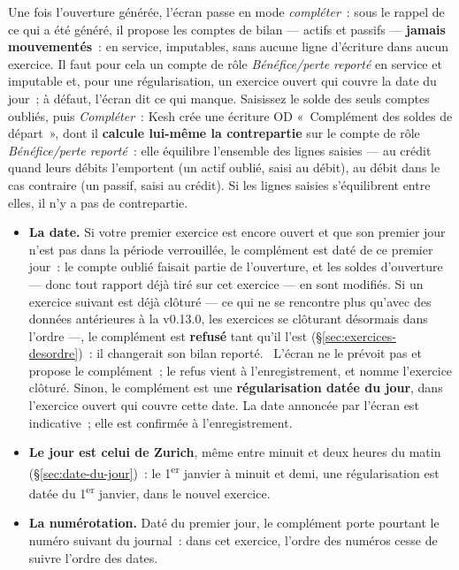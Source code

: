 \documentclass[a4paper,11pt,oneside]{article}
\begin{document}
Une fois l'ouverture générée, l'écran passe en mode \emph{compléter}~: sous le rappel de ce qui a été généré, il propose les comptes de bilan --- actifs et passifs --- \textbf{jamais mouvementés}~: en service, imputables, sans aucune ligne d'écriture dans aucun exercice. Il faut pour cela un compte de rôle \emph{Bénéfice/perte reporté} en service et imputable et, pour une régularisation, un exercice ouvert qui couvre la date du jour~; à défaut, l'écran dit ce qui manque. Saisissez le solde des seuls comptes oubliés, puis \emph{Compléter}~: Kesh crée une écriture OD «~Complément des soldes de départ~», dont il \textbf{calcule lui-même la contrepartie} sur le compte de rôle \emph{Bénéfice/perte reporté}~: elle équilibre l'ensemble des lignes saisies --- au crédit quand leurs débits l'emportent (un actif oublié, saisi au débit), au débit dans le cas contraire (un passif, saisi au crédit). Si les lignes saisies s'équilibrent entre elles, il n'y a pas de contrepartie.

\begin{itemize}
    \item \textbf{La date.} Si votre premier exercice est encore ouvert et que son premier jour n'est pas dans la période verrouillée, le complément est daté de ce premier jour~: le compte oublié faisait partie de l'ouverture, et les soldes d'ouverture --- donc tout rapport déjà tiré sur cet exercice --- en sont modifiés. Si un exercice suivant est déjà clôturé --- ce qui ne se rencontre plus qu'avec des données antérieures à la v0.13.0, les exercices se clôturant désormais dans l'ordre ---, le complément est \textbf{refusé} tant qu'il l'est (\S\ref{sec:exercices-desordre})~: il changerait son bilan reporté. \keshAttention\ L'écran ne le prévoit pas et propose le complément~; le refus vient à l'enregistrement, et nomme l'exercice clôturé. Sinon, le complément est une \textbf{régularisation datée du jour}, dans l'exercice ouvert qui couvre cette date. La date annoncée par l'écran est indicative~; elle est confirmée à l'enregistrement.
    \item \textbf{Le jour est celui de Zurich}, même entre minuit et deux heures du matin (\S\ref{sec:date-du-jour})~: le 1\textsuperscript{er} janvier à minuit et demi, une régularisation est datée du 1\textsuperscript{er} janvier, dans le nouvel exercice.
    \item \textbf{La numérotation.} Daté du premier jour, le complément porte pourtant le numéro suivant du journal~: dans cet exercice, l'ordre des numéros cesse de suivre l'ordre des dates.
\end{itemize}
\end{document}

